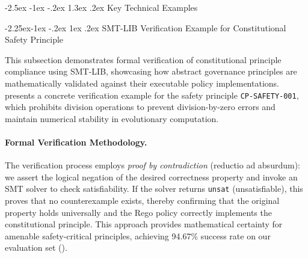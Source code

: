 \documentclass[manuscript,screen,9pt]{acmart}
\makeatletter
\renewcommand\section{\@startsection{section}{1}{\z@}%
  {-2.5ex \@plus -1ex \@minus -.2ex}%
  {1.3ex \@plus.2ex}%
  {\normalfont\Large\bfseries}}
\renewcommand\subsection{\@startsection{subsection}{2}{\z@}%
  {-2.25ex\@plus -1ex \@minus -.2ex}%
  {1ex \@plus .2ex}%
  {\normalfont\large\bfseries}}
\makeatother
\begin{document}
\section{Key Technical Examples}
\label{app:key_examples}

\subsection{SMT-LIB Verification Example for Constitutional Safety Principle}
\label{subsubsec:smtlib_verification_example}

This subsection demonstrates formal verification of constitutional principle compliance using SMT-LIB, showcasing how abstract governance principles are mathematically validated against their executable policy implementations.  presents a concrete verification example for the safety principle \texttt{CP-SAFETY-001}, which prohibits division operations to prevent division-by-zero errors and maintain numerical stability in evolutionary computation.

\paragraph{Formal Verification Methodology.} The verification process employs \textit{proof by contradiction} (reductio ad absurdum): we assert the logical negation of the desired correctness property and invoke an SMT solver to check satisfiability. If the solver returns \texttt{unsat} (unsatisfiable), this proves that no counterexample exists, thereby confirming that the original property holds universally and the Rego policy correctly implements the constitutional principle. This approach provides mathematical certainty for amenable safety-critical principles, achieving 94.67\% success rate on our evaluation set ().
\end{document}
